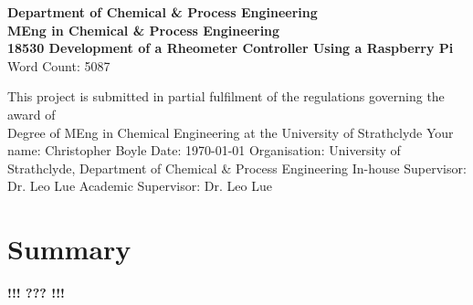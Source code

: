 \documentclass[twoside,a4]{report}
\def\atitle{Development of a Rheometer Controller Using a Raspberry Pi}
\def\thewords{5087} %
\def\br{\newline \newline \noindent}
\def\cbh{\large\bfseries !!! ??? !!! \normalsize\normalfont}
\def\achapter{preamble}  %
\begin{document}
	\begin{titlepage}
		\centering
		\vskip3cm
		{
			\bfseries\Large
			Department of Chemical \& Process Engineering\\
			\vskip1cm
			MEng in Chemical \& Process Engineering\\
			18530
			\vskip3cm
			\LARGE\atitle
		}
		\vskip3cm
		{\small Word Count: \thewords}
		\vskip1cm
		\begin{flushleft}
			This project is submitted in partial fulfilment of the regulations governing the award of \\
			Degree of MEng in Chemical Engineering at the University of Strathclyde
			\vskip2cm
			Your name: Christopher Boyle \hfill Date: \today
			\vskip1cm
			Organisation: University of Strathclyde, Department of Chemical \& Process Engineering\newline%
			In-house Supervisor: Dr. Leo Lue \newline%
			Academic Supervisor: Dr. Leo Lue
		\end{flushleft}
	\end{titlepage}

	
	\chapter*{Summary}
	\def\achapter{Summary}
	\newpage
	
	\def\achapter{Contents}
	\tableofcontents
	\noindent \space \br \space \br \space \br \space \br \space \br \space \br \space \br 
	\begin{center}\vfill \cbh \vfill \end{center}
\end{document}
